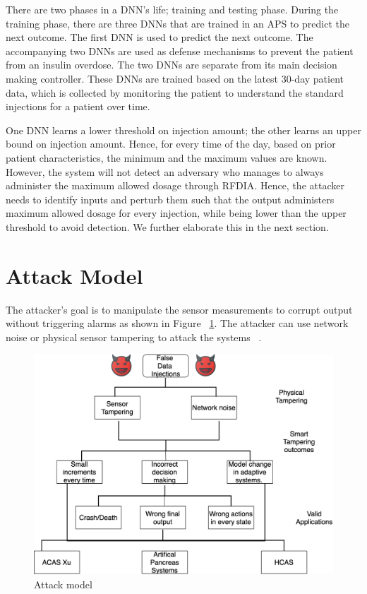 There are two phases in a \ac{DNN}'s life; training and testing phase. 
During the training phase, there are three \ac{DNN}s that are trained in an \ac{APS} to predict the next outcome. 
The first \ac{DNN} is used to predict the next outcome. 
The accompanying two \ac{DNN}s are used as defense mechanisms to prevent the patient from an insulin overdose.  
The two \ac{DNN}s are separate from its main decision making controller. 
These \ac{DNN}s are trained based on the latest 30-day patient data, which is collected by monitoring the patient to understand the standard injections for a patient over time. 

One \ac{DNN} learns a lower threshold on injection amount; the other learns an upper bound on injection amount. 
Hence, for every time of the day, based on prior patient characteristics, the minimum and the maximum values are known. 
However, the system will not detect  an adversary  who manages to always administer the maximum allowed dosage through \ac{RFDIA}. 
Hence, the attacker needs to identify inputs and  perturb them  such that the output administers maximum allowed dosage for every injection,
  while being lower than the upper threshold to avoid detection. 
  We further elaborate this in the next section. 


\section{Attack Model}
The attacker's goal is to manipulate the sensor measurements to corrupt output without triggering alarms as shown in Figure ~\ref{fig:attackmodelphysical}. 
The attacker can use network noise or physical sensor tampering to attack the systems ~\cite{10.1145/3319535.3339815}.
 
\begin{figure}
	\centering
	\includegraphics[width=0.7\linewidth]{Images/Attackmodelphysical}
	\caption{Attack model}
	\label{fig:attackmodelphysical}
\end{figure}

